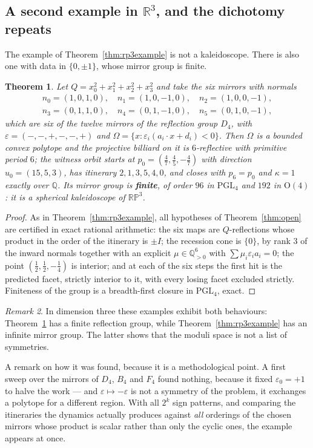 \documentclass[11pt,a4paper]{article}
\theoremstyle{plain}
\newtheorem{theorem}{Theorem}[section]
\theoremstyle{definition}
\theoremstyle{remark}
\newtheorem{remark}[theorem]{Remark}
\newcommand{\PGL}{\mathrm{PGL}}
\begin{document}
\subsection{A second example in $\mathbb{R}^3$, and the dichotomy repeats}

The example of Theorem~\ref{thm:rp3example} is not a kaleidoscope. There is also
one with data in $\{0,\pm1\}$, whose mirror group is finite.

\begin{theorem}\label{thm:rp3d4}
Let $Q=x_0^2+x_1^2+x_2^2+x_3^2$ and take the six mirrors with normals
\[
\begin{gathered}
 n_0=(1,0,1,0),\quad n_1=(1,0,-1,0),\quad n_2=(1,0,0,-1),\\
 n_3=(0,1,1,0),\quad n_4=(0,1,-1,0),\quad n_5=(0,1,0,-1),
\end{gathered}
\]
which are six of the twelve mirrors of the reflection group $D_4$, with
$\varepsilon=(-,-,+,-,-,+)$ and $\Omega=\{x:\varepsilon_i(a_i\cdot x+d_i)<0\}$. Then
$\Omega$ is a bounded convex polytope and the projective billiard on it is
$6$-reflective with primitive period $6$; the witness orbit starts at
$p_0=(\tfrac47,\tfrac45,-\tfrac47)$ with direction $u_0=(15,5,3)$, has itinerary
$2,1,3,5,4,0$, and closes with $p_6=p_0$ and $\kappa=1$ exactly over $\mathbb{Q}$.
Its mirror group is \textbf{finite}, of order $96$ in $\PGL_4$ and $192$ in
$\mathrm{O}(4)$: it is a spherical kaleidoscope of $\mathbb{RP}^3$.
\end{theorem}

\begin{proof}
As in Theorem~\ref{thm:rp3example}, all hypotheses of Theorem~\ref{thm:open} are
certified in exact rational arithmetic: the six maps are $Q$-reflections whose
product in the order of the itinerary is $\pm I$; the recession cone is $\{0\}$,
by rank $3$ of the inward normals together with an explicit
$\mu\in\mathbb{Q}^6_{>0}$ with $\sum\mu_i\varepsilon_ia_i=0$; the point
$(\tfrac12,\tfrac12,-\tfrac14)$ is interior; and at each of the six steps the first
hit is the predicted facet, strictly interior to it, with every losing facet excluded
strictly. Finiteness of the group is a breadth-first closure in $\PGL_4$, exact.
\end{proof}

\begin{remark}
In dimension three these examples exhibit both behaviours: Theorem~\ref{thm:rp3d4}
has a finite reflection group, while Theorem~\ref{thm:rp3example} has an infinite
mirror group. The latter shows that the moduli space is not a list of symmetries.

A remark on how it was found, because it is a methodological point. A first sweep over
the mirrors of $D_4$, $B_4$ and $F_4$ found nothing, because it fixed
$\varepsilon_0=+1$ to halve the work --- and $\varepsilon\mapsto-\varepsilon$ is not a
symmetry of the problem, it exchanges a polytope for a different region. With all
$2^k$ sign patterns, and comparing the itineraries the dynamics actually produces
against \emph{all} orderings of the chosen mirrors whose product is scalar rather
than only the cyclic ones, the example appears at once.
\end{remark}
\end{document}
